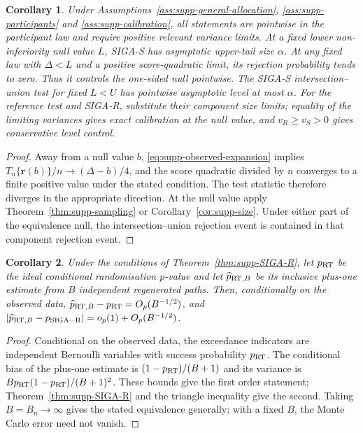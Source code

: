 \documentclass[12pt,a4paper]{article}
\newtheorem{corollary}{Corollary}
\theoremstyle{definition}
\theoremstyle{remark}\newtheorem{remark}{Remark}
\numberwithin{equation}{section}
\begin{document}
\begin{corollary}\label{cor:supp-NI-EQ}
Under Assumptions~\ref{ass:supp-general-allocation}, \ref{ass:supp-participants} and \ref{ass:supp-calibration}, all statements are pointwise in the participant law and require positive relevant variance limits. At a fixed lower non-inferiority null value $L$, SIGA-S has asymptotic upper-tail size $\alpha$. At any fixed law with $\Delta<L$ and a positive score-quadratic limit, its rejection probability tends to zero. Thus it controls the one-sided null pointwise. The SIGA-S intersection--union test for fixed $L<U$ has pointwise asymptotic level at most $\alpha$. For the reference test and SIGA-R, substitute their component size limits; equality of the limiting variances gives exact calibration at the null value, and $v_R\ge v_S>0$ gives conservative level control.
\end{corollary}
\begin{proof}
Away from a null value $b$, \eqref{eq:supp-observed-expansion} implies $T_n\{\bm r(b)\}/n\to(\Delta-b)/4$, and the score quadratic divided by $n$ converges to a finite positive value under the stated condition. The test statistic therefore diverges in the appropriate direction. At the null value apply Theorem~\ref{thm:supp-sampling} or Corollary~\ref{cor:supp-size}. Under either part of the equivalence null, the intersection--union rejection event is contained in that component rejection event.
\end{proof}

\begin{corollary}\label{cor:supp-MC}
Under the conditions of Theorem~\ref{thm:supp-SIGA-R}, let $p_{\rm RT}$ be the ideal conditional randomisation $p$-value and let $\widehat p_{{\rm RT},B}$ be its inclusive plus-one estimate from $B$ independent regenerated paths. Then, conditionally on the observed data, $\widehat p_{{\rm RT},B}-p_{\rm RT}=O_p(B^{-1/2})$, and $|\widehat p_{{\rm RT},B}-p_{{\rm SIGA-R}}|=o_p(1)+O_p(B^{-1/2})$.
\end{corollary}

\begin{proof}
Conditional on the observed data, the exceedance indicators are independent Bernoulli variables with success probability $p_{\rm RT}$. The conditional bias of the plus-one estimate is $(1-p_{\rm RT})/(B+1)$ and its variance is $Bp_{\rm RT}(1-p_{\rm RT})/(B+1)^2$. These bounds give the first order statement; Theorem~\ref{thm:supp-SIGA-R} and the triangle inequality give the second. Taking $B=B_n\to\infty$ gives the stated equivalence generally; with a fixed $B$, the Monte Carlo error need not vanish.
\end{proof}
\end{document}
